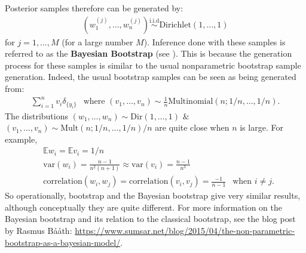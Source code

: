 \documentclass{scrartcl}
\newcommand{\E}{{\mathbb E}}
\begin{document}
Posterior samples therefore can be generated by:
\begin{align*}
  (w_1^{(j)}, \dots, w_n^{(j)}) \overset{\text{i.i.d}}{\sim}
  \text{Dirichlet}(1, \dots, 1)  
\end{align*}
for $j = 1, \dots, M$ (for a large number $M$). Inference done with
these samples is referred to as the \textbf{Bayesian Bootstrap} (see
\citet{Rubin1981BayesianBootstrap}). This is because the generation
process for these samples is similar to the usual nonparametric bootstrap
sample generation. Indeed, the usual bootstrap samples 
can be seen as being generated from:
\begin{align*}
  \sum_{i=1}^n v_i \delta_{\{y_i\}} ~~ \text{ where } (v_1, \dots,
  v_n) \sim \frac{1}{n} \text{Multinomial}(n; 1/n, \dots, 1/n). 
\end{align*}
The distributions $(w_1, \dots, w_n) \sim \text{Dir}(1,
\dots, 1)$ $\&$ $(v_1, \dots, v_n) \sim \text{Mult}(n; 1/n, \dots,
1/n)/n$ are quite close when $n$ is large. For example,
\begin{align*}
  & \E w_i = \E v_i = 1/n \\
  & \text{var}(w_i) = \frac{n-1}{n^2(n+1)} \approx \text{var}(v_i) =
    \frac{n-1}{n^3} \\
  & \text{correlation}(w_i, w_j) = \text{correlation}(v_i, v_j) =
    \frac{-1}{n-1} ~~ \text{ when } i \neq j. 
\end{align*}
So operationally, bootstrap and the Bayesian bootstrap give very
similar results, although conceptually they are quite different. For
more information on the Bayesian bootstrap and its relation to the
classical bootstrap, see the blog post by Rasmus B{\aa}{\aa}th:
\url{https://www.sumsar.net/blog/2015/04/the-non-parametric-bootstrap-as-a-bayesian-model/}.    
\end{document}
